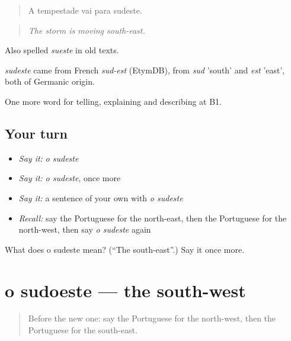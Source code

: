 \begin{quote}
A tempestade vai para sudeste.
\end{quote}

\begin{quote}
\emph{The storm is moving south-east.}
\end{quote}

Also spelled \emph{sueste} in old texts.

\begin{cousinweb}
\emph{sudeste} came from French \emph{sud-est} (EtymDB), from \emph{sud} 'south' and \emph{est} 'east', both of Germanic origin.
\end{cousinweb}

\begin{grammarlens}[title={What you've built}]
One more word for telling, explaining and describing at B1.
\end{grammarlens}

\subsection*{Your turn}
\begin{itemize}
\raggedright
  \item \emph{Say it:} \emph{o sudeste}
  \item \emph{Say it:} \emph{o sudeste}, once more
  \item \emph{Say it:} a sentence of your own with \emph{o sudeste}
  \item \emph{Recall:} say the Portuguese for the north-east, then the Portuguese for the north-west, then say \emph{o sudeste} again
\end{itemize}

\begin{tcolorbox}[breakable,colback=teal!4,colframe=teal!35!black,title={Before you move on}]
What does o sudeste mean? (\textquotedblleft{}The south-east\textquotedblright{}.) Say it once more.
\end{tcolorbox}
\section[o sudoeste]{o sudoeste — the south-west}

\label{lesson:PT-C439-sudoeste}



\begin{quote}
Before the new one: say the Portuguese for the north-west, then the Portuguese for the south-east.
\end{quote}

